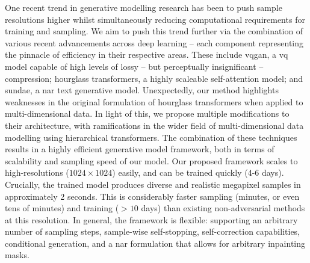 One recent trend in generative modelling research has been to push sample
resolutions higher whilst simultaneously reducing computational requirements for
training and sampling. We aim to push this trend further via the combination of
various recent advancements across deep learning -- each component representing
the pinnacle of efficiency in their respective areas. These include
\acrfull{vqgan}, a \gls{vq} model capable of high levels of lossy -- but
perceptually insignificant -- compression; hourglass transformers, a highly
scaleable self-attention model; and \acrfull{sundae}, a \acrfull{nar} text
generative model. Unexpectedly, our method highlights weaknesses in the original
formulation of hourglass transformers when applied to multi-dimensional data. In
light of this, we propose multiple modifications to their architecture, with
ramifications in the wider field of multi-dimensional data modelling using
hierarchical transformers. The combination of these techniques results in a
highly efficient generative model framework, both in terms of scalability and
sampling speed of our model. Our proposed framework scales to high-resolutions
($1024 \times 1024$) easily, and can be trained quickly (4-6 days). Crucially,
the trained model produces diverse and realistic megapixel samples in
approximately 2 seconds. This is considerably faster sampling (minutes, or even
tens of minutes) and training ($>10$ days) than existing non-adversarial methods
at this resolution. In general, the framework is flexible: supporting an
arbitrary number of sampling steps, sample-wise self-stopping, self-correction
capabilities, conditional generation, and a \acrshort{nar} formulation that
allows for arbitrary inpainting masks.
